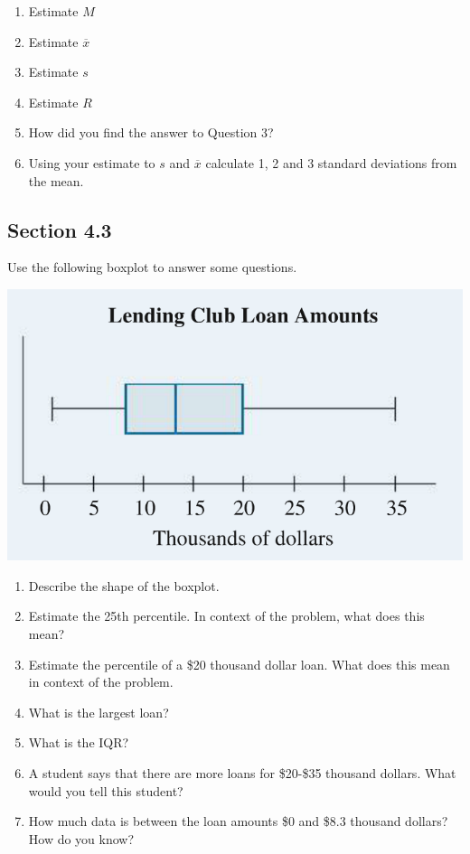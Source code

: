 \documentclass[12pt]{scrartcl}
\theoremstyle{definition}
\begin{document}
\begin{enumerate}
	\item Estimate $M$
	\item Estimate $\overline{x}$
	\item Estimate $s$
	\item Estimate $R$
	\item How did you find the answer to Question 3?
	\item Using your estimate to $s$ and $\overline{x}$ calculate 1, 2 and 3 standard deviations from the mean.
\end{enumerate}

\subsection*{Section 4.3}
Use the following boxplot to answer some questions.
\begin{center}
	\includegraphics[scale=0.5]{RevSec44}
\end{center}

\begin{enumerate}
	\item Describe the shape of the boxplot.
	\item Estimate the 25th percentile. In context of the problem, what does this mean?
	\item Estimate the percentile of a \$20 thousand dollar loan. What does this mean in context of the problem.
	\item What is the largest loan?
	\item What is the IQR?
	\item A student says that there are more loans for \$20-\$35 thousand dollars. What would you tell this student?
	\item How much data is between the loan amounts \$0 and \$8.3 thousand dollars? How do you know?
\end{enumerate}
\end{document}

